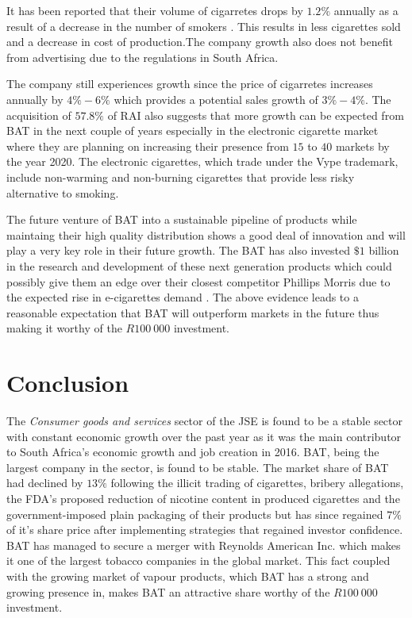 \documentclass[letterpaper, 10 pt, conference]{ieeeconf}  %
\begin{document}
It has been reported that their volume of cigarretes drops by $1.2\%$ annually as a result of a decrease in the number of smokers \cite{BAT_nextgen}. This results in less cigarettes sold and a decrease in cost of production.The company growth also does not benefit from advertising due to the regulations in South Africa.

The company still experiences growth since the price of cigarretes increases annually by $4\%-6\%$ \cite{BAT_hist} which provides a potential sales growth of $3\%-4\%$. The acquisition of $57.8\%$ of RAI \cite{BAT_vap} also suggests that more growth can be expected from BAT in the next couple of years especially in the electronic cigarette market where they are planning on increasing their presence from $15$ to $40$ markets by the year 2020. The electronic cigarettes, which trade under the Vype trademark, include non-warming and non-burning cigarettes that provide less risky alternative to smoking.

The future venture of BAT into a sustainable pipeline of products while maintaing their high quality distribution shows a good deal of innovation and will play a very key role in their future growth. The BAT has also invested $\$1$ billion in the research and development of these next generation products which could possibly give them an edge over their closest competitor Phillips Morris due to the expected rise in e-cigarettes demand \cite{BAT_comp}\cite{BAT_nextgen}. The above evidence leads to a reasonable expectation that BAT will outperform markets in the future thus making it worthy of the $R100 ~ 000$ investment.

\section{Conclusion}

The \textit{Consumer goods and services} sector of the JSE is found to be a stable sector with constant economic growth over the past year as it was the main contributor to South Africa's economic growth and job creation in 2016. BAT, being the largest company in the sector, is found to be stable. The market share of BAT had declined by $13\%$ following the illicit trading of cigarettes, bribery allegations, the FDA's proposed reduction of nicotine content in produced cigarettes and the government-imposed plain packaging of their products but has since regained $7\%$ of it's share price after implementing strategies that regained investor confidence. BAT has managed to secure a merger with Reynolds American Inc. which makes it one of the largest tobacco companies in the global market. This fact coupled with the growing market of vapour products, which BAT has a strong and growing presence in, makes BAT an attractive share worthy of the $R100 ~ 000$ investment.
\end{document}
